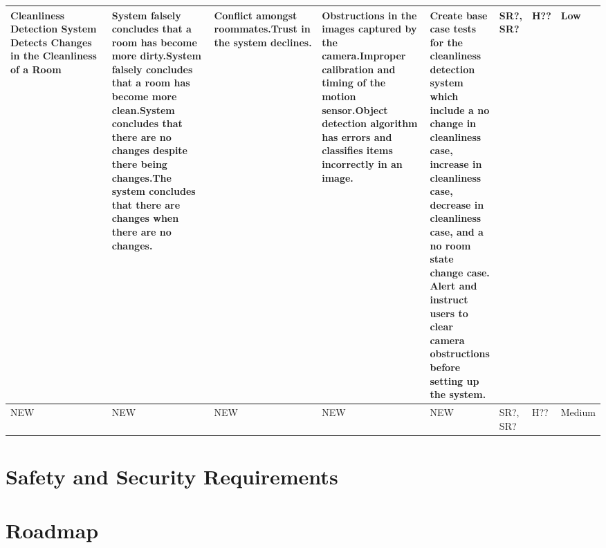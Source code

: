 \documentclass{article}
\begin{document}
\begin{table}[H]
\begin{adjustbox}{width=\textwidth}
\begin{tabular}{|p{0.27\linewidth} | p{0.25\linewidth} | p{0.22\linewidth}|  p{0.22\linewidth}|  p{0.30\linewidth}|  p{0.07\linewidth}|  p{0.07\linewidth}|p{0.12\linewidth}| }
         \hline
         Cleanliness Detection System Detects Changes in the Cleanliness of a Room & System falsely concludes that a room has become more dirty.\newline\newline System falsely concludes that a room has become more clean.\newline\newline System concludes that there are no changes despite there being changes.\newline\newline The system concludes that there are changes when there are no changes. & Conflict amongst roommates.\newline\newline Trust in the system declines. & Obstructions in the images captured by the camera.\newline\newline Improper calibration and timing of the motion sensor.\newline\newline Object detection algorithm has errors and classifies items incorrectly in an image.& Create base case tests for the cleanliness detection system which include a no change in cleanliness case, increase in cleanliness case, decrease in cleanliness case, and a no room state change case. \newline\newline Alert and instruct users to clear camera obstructions before setting up the system. & SR?, SR? & H?? & Low\\
         \hline
         
         \hline
         NEW & NEW\newline & NEW & NEW & NEW & SR?, SR? & H?? & Medium\\
         \hline
    \end{tabular}
    \end{adjustbox}
    \label{tab:my_label}
\end{table}


\newpage

\section{Safety and Security Requirements}


\section{Roadmap}
\end{document}
